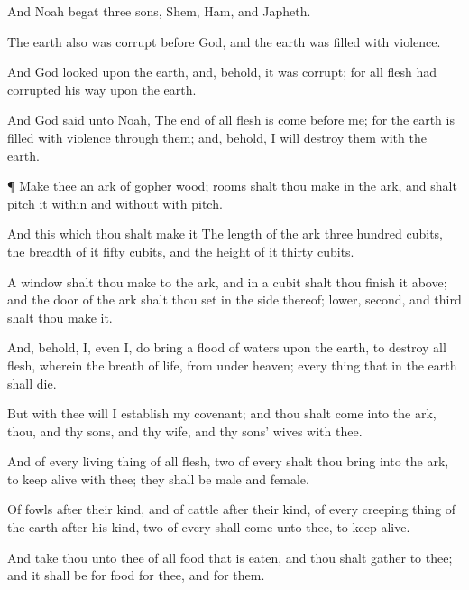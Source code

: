 {And
Noah
begat
three
sons,
Shem,
Ham, and
Japheth.


\par }{\PP {}The
earth also was
corrupt
before
God, and the
earth was
filled with
violence.

And
God
looked upon the
earth, and, behold, it was
corrupt; for all
flesh had
corrupted his
way upon the
earth.


\par }{\PP {}And
God
said unto
Noah, The
end of all
flesh is
come before
me; for the
earth is filled
with
violence through
them; and, behold, I will
destroy them
with the
earth.


\par }{\PP {}¶
Make thee an
ark of
gopher
wood;
rooms shalt thou
make
in the
ark, and shalt
pitch it
within and
without with
pitch.

And this
{} which thou shalt
make it
{} The
length of the
ark
{}
three
hundred
cubits, the
breadth of it
fifty
cubits, and the
height of it
thirty
cubits.

A
window shalt thou
make to the
ark, and in a
cubit shalt thou
finish it
above; and the
door of the
ark shalt thou
set in the side
thereof;
{}
lower,
second, and
third
{} shalt thou
make it.

And,
behold,
I, even I, do
bring a
flood of
waters upon the
earth, to
destroy all
flesh, wherein
{} the
breath of
life, from
under
heaven;
{} every
thing that
{} in the
earth shall
die.

But with thee will I
establish my
covenant; and thou shalt
come
into the
ark,
thou, and thy
sons, and thy
wife, and thy
sons’
wives with thee.

And of every living
thing of all
flesh,
two of every
{} shalt thou
bring into the
ark, to keep
{}
alive with thee; they shall be
male and
female.

Of
fowls after their
kind, and of
cattle after their
kind, of every creeping
thing of the
earth after his
kind,
two of every
{} shall
come unto thee, to keep
{}
alive.

And
take thou unto thee of all
food that is
eaten, and thou shalt
gather
{} to thee; and it shall be for
food for thee, and for them.

}
